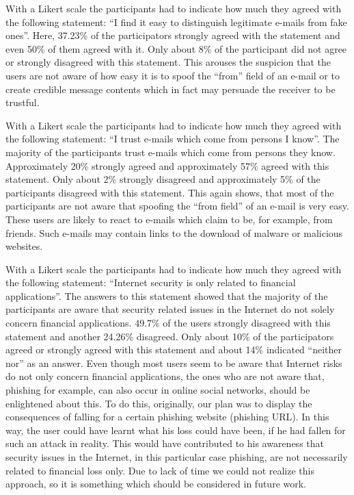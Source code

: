 \begin{description}[leftmargin=0cm]
	
	\item[Self-Assessment - Distinguish legitimate from illegitimate e-mails] With a Likert scale the participants had to indicate how much they agreed with the following statement: ``I find it easy to distinguish legitimate e-mails from fake ones''. Here, 37.23\% of the participators strongly agreed with the statement and even 50\% of them agreed with it.
 Only about 8\% of the participant did not agree or strongly disagreed with this statement.
 This arouses the suspicion that the users are not aware of how easy it is to spoof the ``from'' field of an e-mail or to create credible message contents which in fact may persuade the receiver to be trustful.

	
	\item[Self-Assessment - Trust to e-mails from known parties]  With a Likert scale the participants had to indicate how much they agreed with the following statement: ``I trust e-mails which come from persons I know''. The majority of the participants trust e-mails which come from persons they know.
 Approximately 20\% strongly agreed and approximately 57\% agreed with this statement.
 Only about 2\% strongly disagreed and approximately 5\% of the participants disagreed with this statement.
 This again shows, that most of the participants are not aware that spoofing the ``from field'' of an e-mail is very easy.
 These users are likely to react to e-mails which claim to be, for example, from friends.
 Such e-mails may contain links to the download of malware or malicious websites.


	\item[Self-Assessment - Internet security is only related to financial applications] With a Likert scale the participants had to indicate how much they agreed with the following statement: ``Internet security is only related to financial applications''. The answers to this statement showed that the majority of the participants are aware that security related issues in the Internet do not solely concern financial applications.
 49.7\% of the users strongly disagreed with this statement and another 24.26\% disagreed.
 Only about 10\% of the participators agreed or strongly agreed with this statement and about 14\% indicated ``neither nor'' as an answer.
 Even though most users seem to be aware that Internet risks do not only concern financial applications, the ones who are not aware that, phishing for example, can also occur in online social networks, should be enlightened about this.
 To do this, originally, our plan was to display the consequences of falling for a certain phishing website (phishing URL). In this way, the user could have learnt what his loss could have been, if he had fallen for such an attack in reality.
 This would have contributed to his awareness that security issues in the Internet, in this particular case phishing, are not necessarily related to financial loss only.
 Due to lack of time we could not realize this approach, so it is something which should be considered in future work.



\end{description}
